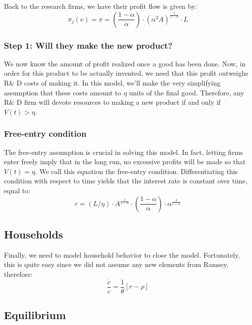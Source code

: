 \documentclass[12pt]{report}
\begin{document}
Back to the research firms, we have their profit flow is given by: $$\pi_j(v) = \pi = \left(\frac{1-\alpha}{\alpha}\right)\cdot(\alpha^2 A)^{\frac{1}{1-\alpha}}\cdot L $$ 

\subsubsection{Step 1: Will they make the new product?}

We now know the amount of profit realized once a good has been done. Now, in order for this product to be actually invented, we need that this profit outweighs R\& D costs of making it. In this model, we'll make the very simplifying assumption that these costs amount to $\eta$ units of the final good. Therefore, any R\& D firm will devote resources to making a new product if and only if $V(t)>\eta $.

\subsubsection{Free-entry condition}

The free-entry assumption is crucial in solving this model. In fact, letting firms enter freely imply that in the long run, no excessive profits will be made so that $V(t) = \eta$. We call this equation the free-entry condition. Differentiating this condition with respect to time yields that the interest rate is constant over time, equal to: $$r = (L/\eta)\cdot A^{\frac{1}{1-\alpha}} \cdot \left(\frac{1-\alpha}{\alpha}\right)\cdot\alpha^{\frac{2}{1-\alpha}} $$

\subsection{Households}

Finally, we need to model household behavior to close the model. Fortunately, this is quite easy since we did not assume any new elements from Ramsey, therefore: $$\frac{\dot c}{c} = \frac{1}{\theta} [ r - \rho] $$

\subsection{Equilibrium}
\end{document}
